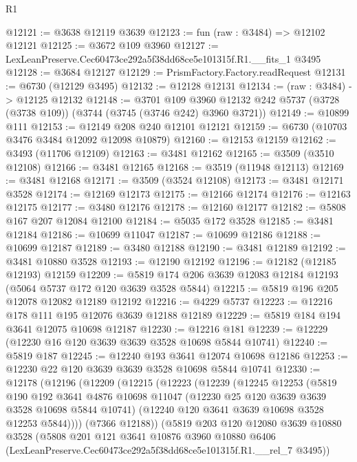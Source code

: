 \begin{lexlean}{R1}
\begin{coremodule}
@12121 := @3638 @12119 @3639
@12123 := fun (raw : @3484) => @12102 @12121
@12125 := @3672 @109 @3960
@12127 := LexLeanPreserve.Cec60473ce292a5f38dd68ce5e101315f.R1.__fits_1 @3495
@12128 := @3684 @12127
@12129 := PrismFactory.Factory.readRequest
@12131 := @6730 (@12129 @3495)
@12132 := @12128 @12131
@12134 := (raw : @3484) -> @12125 @12132
@12148 := @3701
    @109
    @3960
    @12132
    @242
    @5737
    (@3728 (@3738 @109))
    (@3744 (@3745 (@3746 @242) @3960 @3721))
@12149 := @10899 @111
@12153 := @12149 @208 @240 @12101 @12121
@12159 := @6730 (@10703 @3476 @3484 @12092 @12098 @10879)
@12160 := @12153 @12159
@12162 := @3493 (@11706 @12109)
@12163 := @3481 @12162
@12165 := @3509 (@3510 @12108)
@12166 := @3481 @12165
@12168 := @3519 (@11948 @12113)
@12169 := @3481 @12168
@12171 := @3509 (@3524 @12108)
@12173 := @3481 @12171 @3528
@12174 := @12169 @12173
@12175 := @12166 @12174
@12176 := @12163 @12175
@12177 := @3480 @12176
@12178 := @12160 @12177
@12182 := @5808 @167 @207 @12084 @12100
@12184 := @5035 @172 @3528
@12185 := @3481 @12184
@12186 := @10699 @11047
@12187 := @10699 @12186
@12188 := @10699 @12187
@12189 := @3480 @12188
@12190 := @3481 @12189
@12192 := @3481 @10880 @3528
@12193 := @12190 @12192
@12196 := @12182 (@12185 @12193) @12159
@12209 := @5819 @174 @206 @3639 @12083 @12184 @12193 (@5064 @5737 @172 @120 @3639 @3528 @5844)
@12215 := @5819 @196 @205 @12078 @12082 @12189 @12192
@12216 := @4229 @5737
@12223 := @12216 @178 @111 @195 @12076 @3639 @12188 @12189
@12229 := @5819 @184 @194 @3641 @12075 @10698 @12187
@12230 := @12216 @181
@12239 := @12229 (@12230 @16 @120 @3639 @3639 @3528 @10698 @5844 @10741)
@12240 := @5819 @187
@12245 := @12240 @193 @3641 @12074 @10698 @12186
@12253 := @12230 @22 @120 @3639 @3639 @3528 @10698 @5844 @10741
@12330 := @12178
    (@12196
      (@12209
        (@12215
          (@12223
            (@12239
              (@12245
                @12253
                (@5819
                  @190
                  @192
                  @3641
                  @4876
                  @10698
                  @11047
                  (@12230 @25 @120 @3639 @3639 @3528 @10698 @5844 @10741)
                  (@12240 @120 @3641 @3639 @10698 @3528 @12253 @5844))))
            (@7366 @12188))
          (@5819
            @203
            @120
            @12080
            @3639
            @10880
            @3528
            (@5808
              @201
              @121
              @3641
              @10876
              @3960
              @10880
              @6406
              (LexLeanPreserve.Cec60473ce292a5f38dd68ce5e101315f.R1.__rel_7 @3495))

\end{coremodule}
\end{lexlean}
